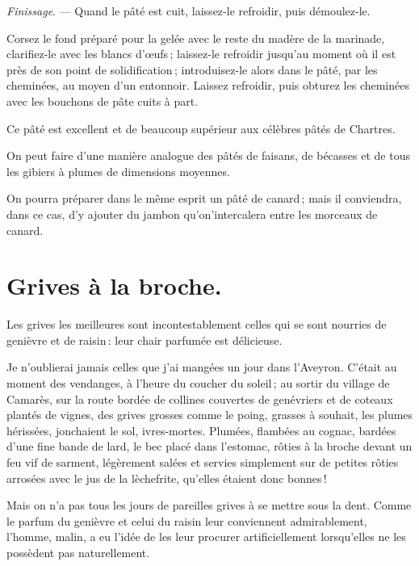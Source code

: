 \medskip

\textit{Finissage}. — Quand le pâté est cuit, laissez-le refroidir, puis démoulez-le.

Corsez le fond préparé pour la gelée avec le reste du madère de la marinade,
clarifiez-le avec les blancs d'œufs ; laissez-le refroidir jusqu'au moment où
il est près de son point de solidification ; introduisez-le alors dans le pâté,
par les cheminées, au moyen d'un entonnoir. Laissez refroidir, puis obturez les
cheminées avec les bouchons de pâte cuits à part.

Ce pâté est excellent et de beaucoup supérieur aux célèbres pâtés de Chartres.

\sk

On peut faire d'une manière analogue des pâtés de faisans, de bécasses et de
tous les gibiers à plumes de dimensions moyennes.

\sk

On pourra préparer dans le même esprit un pâté de canard ; mais il conviendra,
dans ce cas, d'y ajouter du jambon qu'on'intercalera entre les morceaux de
canard.

\section*{\centering Grives à la broche.}
{}

Les grives les meilleures sont incontestablement celles qui se sont nourries de
genièvre et de raisin : leur chair parfumée est délicieuse.

Je n'oublierai jamais celles que j'ai mangées un jour dans l'Aveyron. C'était
au moment des vendanges, à l'heure du coucher du soleil ; au sortir du village
de Camarès, sur la route bordée de collines couvertes de genévriers et de
coteaux plantés de vignes, des grives grosses comme le poing, grasses
à souhait, les plumes hérissées, jonchaient le sol, ivres-mortes. Plumées,
flambées au cognac, bardées d'une fine bande de lard, le bec placé dans
l'estomac, rôties à la broche devant un feu vif de sarment, légèrement salées
et servies simplement sur de petites rôties arrosées avec le jus de la
lèchefrite, qu'elles étaient donc bonnes !

Mais on n'a pas tous les jours de pareilles grives à se mettre sous la dent.
Comme le parfum du genièvre et celui du raisin leur conviennent admirablement,
l'homme, malin, a eu l'idée de les leur procurer artificiellement lorsqu'elles
ne les possèdent pas naturellement.

